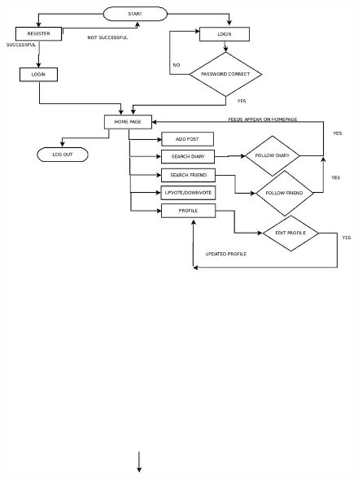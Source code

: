 \documentclass[]{article}
\begin{document}
\begin{figure}

\includegraphics[scale=0.5]{activity_diagram.png}
\end{figure}
\end{document}
